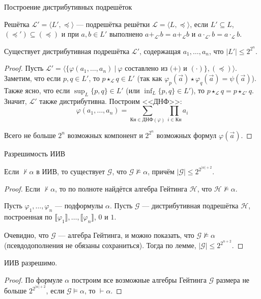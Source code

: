 \documentclass[aspectratio=169]{beamer}
\begin{document}
\begin{frame}{Построение дистрибутивных подрешёток}
\begin{defrus}Решётка $\mathcal{L'} = \langle L', \preceq \rangle$ --- подрешётка решётки $\mathcal{L} = \langle L, \preceq \rangle$, 
если $L' \subseteq L$, $(\preceq') \subseteq (\preceq)$ и 
при $a,b \in L'$ выполнено $a +_{\mathcal{L'}} b = a +_{\mathcal{L}} b$ и $a \cdot_{\mathcal{L'}} b = a \cdot_{\mathcal{L}} b$.
\end{defrus}
\begin{lemmarus}Существует дистрибутивная подрешётка $\mathcal{L'}$, содержащая
$a_1, \dots, a_n$, что $|L'| \le 2^{2^n}$.
\end{lemmarus}
\begin{proof}
Пусть $\mathcal{L'} = \langle\{ \varphi(a_1,\dots,a_n)\ |\ \varphi \text{ составлено из (+) и }(\cdot)\}, (\preceq)\rangle$.
Заметим, что если $p,q \in L'$, то $p \star_{\mathcal{L}} q \in L'$ 
(так как $\varphi_p(\overrightarrow{a})\star\varphi_q(\overrightarrow{a}) = \psi(\overrightarrow{a})$). Также ясно,
что если $\sup_L\{p,q\} \in L'$ (или $\inf_L\{p,q\} \in L'$), то $p \star_{\mathcal{L}} q = p \star_{\mathcal{L'}} q$.
Значит, $\mathcal{L'}$ также дистрибутивна. Построим <<ДНФ>>:
$$\varphi(a_1,\dots,a_n) = \sum_{\text{Кн} \in \text{ДНФ}(\varphi)}\prod_{i \in \text{Кн}}a_i$$

Всего не больше $2^n$ возможных компонент и $2^{2^n}$ возможных формул $\varphi(\overrightarrow{a})$.
\end{proof}
\end{frame}


\begin{frame}{Разрешимость ИИВ}
\begin{thmrus}Если $\not\vdash \alpha$ в ИИВ, то существует $\mathcal{G}$,
что $\mathcal{G} \not\models \alpha$, причём $|\mathcal{G}| \le 2^{2^{|\alpha|+2}}$.
\end{thmrus}
\begin{proof}Если $\not\vdash \alpha$, то по 
полноте найдётся алгебра Гейтинга $\mathcal{H}$, что
$\mathcal{H} \not\models \alpha$. 

Пусть $\varphi_1, \dots, \varphi_n$ --- подформулы $\alpha$.
Пусть $\mathcal{G}$ --- дистрибутивная подрешётка $\mathcal{H}$, 
построенная по $\llbracket \varphi_1 \rrbracket, \dots, \llbracket \varphi_n \rrbracket$, $0$ и $1$. 

Очевидно, что $\mathcal{G}$ --- алгебра Гейтинга, и можно показать, 
что $\mathcal{G} \not\models \alpha$ (псевдодополнения не обязаны сохраниться).
Тогда по лемме, $|\mathcal{G}| \le 2^{2^{n+2}}$. 
\end{proof}

\begin{thmrus}ИИВ разрешимо.
\end{thmrus}
\begin{proof}По формуле $\alpha$ построим все возможные алгебры Гейтинга $\mathcal{G}$ размера не больше $2^{2^{|\alpha|+2}}$,
если $\mathcal{G}\models\alpha$, то $\vdash\alpha$.
\end{proof}
\end{frame}
\end{document}
